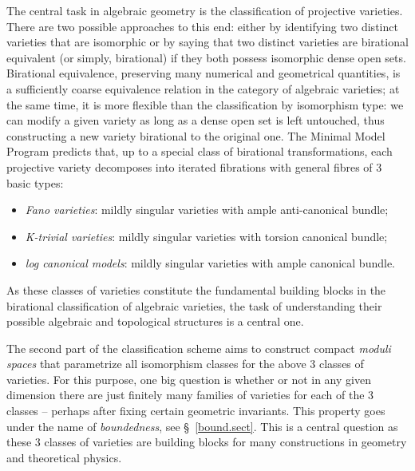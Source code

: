 \documentclass[11pt]{ip-journal}
\theoremstyle{definition}
\begin{document}
The central task in algebraic geometry is the classification of projective varieties.
There are two possible approaches to this end: either by identifying two distinct varieties that are isomorphic or by saying that two distinct varieties are birational equivalent (or simply, birational) if they both possess isomorphic dense open sets.
Birational equivalence, preserving many numerical and geometrical quantities, is a sufficiently coarse equivalence relation in the category of algebraic varieties; at the same time, it is more flexible than the classification by isomorphism type: 
we can modify a given variety as long as a dense open set is left untouched, thus constructing a new variety birational to the original one.
The Minimal Model Program predicts that, up to a special class of birational transformations, each projective variety decomposes into iterated fibrations with general fibres of $3$ basic types:
\begin{itemize}
	\item {\it Fano varieties}: mildly singular varieties with ample anti-canonical bundle;
	\item {\it K-trivial varieties}: mildly singular varieties with torsion canonical bundle;
	\item {\it log canonical models}: mildly singular varieties with ample canonical bundle.
\end{itemize}  
As these classes of varieties constitute the fundamental building blocks in the birational classification of algebraic varieties, the task of understanding their possible algebraic and topological structures is a central one. 

The second part of the classification scheme aims to construct compact {\it moduli spaces} that parametrize all isomorphism classes for the above 3 classes of varieties. 
For this purpose, one big question is whether or not in any given dimension there are just finitely many families of varieties for each of the 3 classes  -- perhaps after fixing certain geometric invariants. 
This property goes under the name of {\it boundedness}, see \S~\ref{bound.sect}.
This is a central question as these 3 classes of varieties are building blocks for many constructions in geometry and theoretical physics. 
\end{document}
